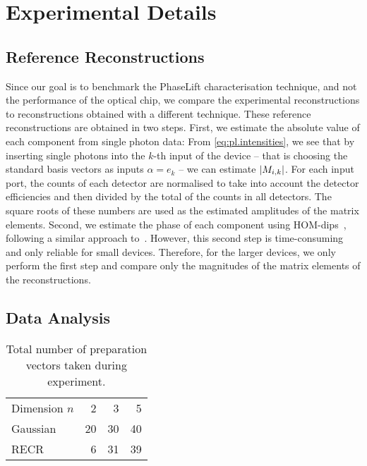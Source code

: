 \section{Experimental Details}%
\label{sec:pl.experimental_details}

\subsection{Reference Reconstructions}%
\label{sub:pl.hom_dip}

Since our goal is to benchmark the PhaseLift characterisation technique, and not the performance of the optical chip, we compare the experimental reconstructions to reconstructions obtained with a different technique.
These reference reconstructions are obtained in two steps.
First, we estimate the absolute value of each component from single photon data:
From \cref{eq:pl.intensities}, we see that by inserting single photons into the $k$-th input of the device -- that is choosing the standard basis vectors as inputs $\alpha =  e_k$ --  we can estimate ${\vert M_{i,k}\vert}$.
For each input port, the counts of each detector are normalised to take into account the detector efficiencies and then divided by the total of the counts in all detectors.
The square roots of these numbers are used as the estimated amplitudes of the matrix elements.
Second, we estimate the phase of each component using HOM-dips~\cite{Hong_1987_Measurement}, following a similar approach to~\cite{Laing_2012_SuperStable,Dhand_2016_Accurate}.
However, this second step is time-consuming and only reliable for small devices.
Therefore, for the larger devices, we only perform the first step and compare only the magnitudes of the matrix elements of the reconstructions.


\subsection{Data Analysis}%
\label{sub:pl.data_analysis}

\begin{table}
  \centering
  \begin{tabular}{l | r r r}
    Dimension $n$ & 2 & 3 & 5 \\
    Gaussian & 20 & 30 & 40 \\
    RECR & 6 & 31 & 39 \\
  \end{tabular}
  \caption{%
    \label{tab:measurements}
    Total number of preparation vectors taken during experiment.
  }
\end{table}

